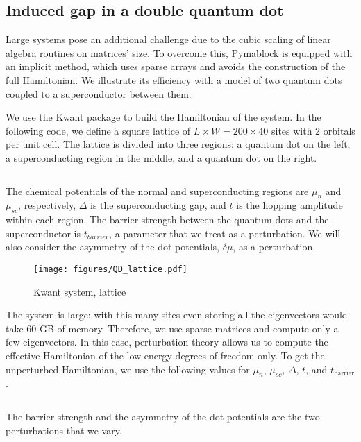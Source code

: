 \subsection{Induced gap in a double quantum dot}

Large systems pose an additional challenge due to the cubic scaling of linear
algebra routines on matrices' size.
To overcome this, Pymablock is equipped with an implicit method, which uses
sparse arrays and avoids the construction of the full Hamiltonian.
We illustrate its efficiency with a model of two quantum dots coupled to a
superconductor between them.

We use the Kwant package \cite{Groth_2014} to build the Hamiltonian of the
system.
In the following code, we define a square lattice of $L \times W = 200 \times
40$ sites with 2 orbitals per unit cell.
The lattice is divided into three regions: a quantum dot on the left, a
superconducting region in the middle, and a quantum dot on the right.
%
\inputminted[firstline=15, lastline=48]{ipython}{code_figures/lattice_system.py}
%
The chemical potentials of the normal and superconducting regions are $\mu_n$
and $\mu_{sc}$, respectively, $\Delta$ is the superconducting gap, and $t$
is the hopping amplitude within each region.
The barrier strength between the quantum dots and the superconductor is
$t_{barrier}$, a parameter that we treat as a perturbation.
We will also consider the asymmetry of the dot potentials, $\delta \mu$, as a
perturbation.
%
\begin{figure}
\centering
\texttt{[image: figures/QD\_lattice.pdf]}
\caption{Kwant system, lattice}
\label{fig:QD_lattice}
\end{figure}

The system is large: with this many sites even storing all the eigenvectors
would take 60 GB of memory.
Therefore, we use sparse matrices and compute only a few eigenvectors.
In this case, perturbation theory allows us to compute the effective
Hamiltonian of the low energy degrees of freedom only.
To get the unperturbed Hamiltonian, we use the following values for $\mu_n$,
$\mu_{sc}$, $\Delta$, $t$, and $t_{\text{barrier}}$.
%
\inputminted[firstline=103, lastline=104]{ipython}{code_figures/lattice_system.py}
%
The barrier strength and the asymmetry of the dot potentials are the two
perturbations that we vary.
%
\inputminted[firstline=106, lastline=111]{ipython}{code_figures/lattice_system.py}

